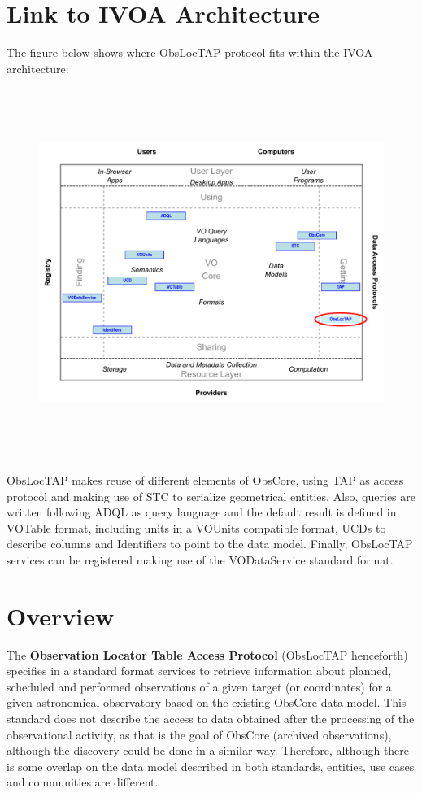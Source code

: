 \documentclass[11pt,a4paper]{ivoa}
\begin{document}
\section*{Link to IVOA Architecture}
The figure below shows where ObsLocTAP protocol fits within the IVOA
architecture:


\begin{figure}[H]
\advance\leftskip 0.0in	\includegraphics[width=5.0in,height=4.73in]{./role_diagram.pdf}
\end{figure}


ObsLocTAP makes reuse of different elements of ObsCore, using TAP as access
protocol and making use of STC to serialize geometrical entities. Also, queries
are written following ADQL as query language and the default result is defined
in VOTable format, including units in a VOUnits compatible format, UCDs to
describe columns and Identifiers to point to the data model. Finally, ObsLocTAP
services can be registered making use of the VODataService standard format.

\pagebreak

\section{Overview}
The \textbf{Observation Locator Table Access Protocol} (ObsLocTAP henceforth)
specifies in a standard format services to retrieve information about planned,
scheduled and performed observations of a given target (or coordinates) for a
given astronomical observatory based on the existing ObsCore data model. This
standard does not describe the access to data obtained after the processing of
the observational activity, as that is the goal of ObsCore (archived
observations), although the discovery could be done in a similar way.
Therefore, although there is some overlap on the data model described in both
standards, entities, use cases and communities are different.
\end{document}
